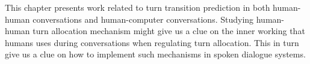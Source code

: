 This chapter presents work related to turn transition prediction in both human-human conversations and human-computer conversations. Studying human-human turn allocation mechanism might give us a clue on the inner working that humans uses during conversations when regulating turn allocation. This in turn give us a clue on how to implement such mechanisms in spoken dialogue systems.
